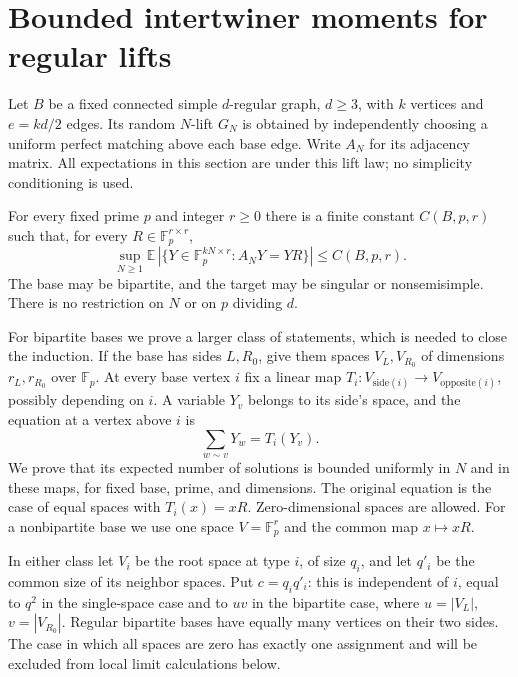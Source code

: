 \section{Bounded intertwiner moments for regular lifts}\label{sec:lift-moment-proof}

Let $B$ be a fixed connected simple $d$-regular graph, $d\ge3$, with
$k$ vertices and $e=kd/2$ edges. Its random $N$-lift $G_N$ is obtained
by independently choosing a uniform perfect matching above each base
edge. Write $A_N$ for its adjacency matrix. All expectations in this
section are under this lift law; no simplicity conditioning is used.

\begin{theorem}\label{thm:lift-bounded-moment}
For every fixed prime $p$ and integer $r\ge0$ there is a finite constant
$C(B,p,r)$ such that, for every $R\in\mathbb F_p^{r\times r}$,
\[
 \sup_{N\ge1}\mathbb E\,
 |\{Y\in\mathbb F_p^{kN\times r}:A_NY=YR\}|\le C(B,p,r).
\]
The base may be bipartite, and the target may be singular or
nonsemisimple. There is no restriction on $N$ or on $p$ dividing $d$.
\end{theorem}

For bipartite bases we prove a larger class of statements, which is
needed to close the induction. If the base has sides $L,R_0$, give
them spaces $V_L,V_{R_0}$ of dimensions $r_L,r_{R_0}$ over
$\mathbb F_p$. At every base vertex $i$ fix a linear map
$T_i:V_{\mathrm{side}(i)}\to V_{\mathrm{opposite}(i)}$, possibly
depending on $i$. A variable $Y_v$ belongs to its side's space, and
the equation at a vertex above $i$ is
\begin{equation}\label{eq:lmp-system}
 \sum_{w\sim v}Y_w=T_i(Y_v).
\end{equation}
We prove that its expected number of solutions is bounded uniformly
in $N$ and in these maps, for fixed base, prime, and dimensions.
The original equation is the case of equal spaces with $T_i(x)=xR$.
Zero-dimensional spaces are allowed. For a nonbipartite base we use
one space $V=\mathbb F_p^r$ and the common map $x\mapsto xR$.

In either class let $V_i$ be the root space at type $i$, of size $q_i$,
and let $q'_i$ be the common size of its neighbor spaces. Put
$c=q_iq'_i$: this is independent of $i$, equal to $q^2$ in the
single-space case and to $uv$ in the bipartite case, where
$u=|V_L|$, $v=|V_{R_0}|$. Regular bipartite bases have equally many
vertices on their two sides. The case in which all spaces are zero
has exactly one assignment and will be excluded from local limit
calculations below.

